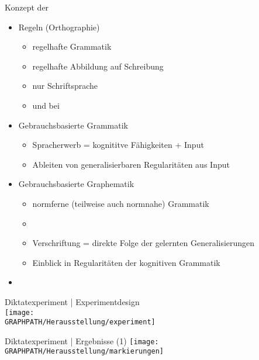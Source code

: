 \begin{frame}
  {Konzept der }
  \begin{itemize}[<+->]
    \item Regeln (Orthographie)
      \begin{itemize}[<+->]
        \item regelhafte Grammatik
        \item regelhafte Abbildung auf Schreibung
        \item nur Schriftsprache
        \item und bei 
      \end{itemize}
      \Halbzeile
    \item Gebrauchsbasierte Grammatik
      \begin{itemize}[<+->]
        \item Spracherwerb = kognititve Fähigkeiten + Input
        \item Ableiten von \alert{generalisierbaren Regularitäten} aus Input
      \end{itemize}
      \Halbzeile
    \item Gebrauchsbasierte Graphematik
      \begin{itemize}[<+->]
        \item normferne (teilweise auch normnahe) Grammatik
        \item {}
        \item Verschriftung = \alert{direkte Folge der gelernten Generalisierungen}
        \item Einblick in Regularitäten der \alert{kognitiven Grammatik}
      \end{itemize}
      \Halbzeile
    \item {}
  \end{itemize}
\end{frame}

\begin{frame}
  {Diktatexperiment | Experimentdesign}
  \citet{SayatzSchaeferHerausstellung}\\
  \Zeile
  \centering 
  \texttt{[image: \\GRAPHPATH/Herausstellung/experiment]}
\end{frame}

\begin{frame}
  {Diktatexperiment | Ergebnisse (1)}
  \centering 
  \texttt{[image: \\GRAPHPATH/Herausstellung/markierungen]}
\end{frame}

